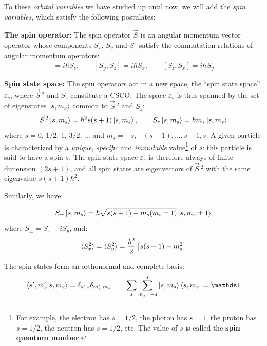 To these \textit{orbital variables} we have studied up until now, we will add the \textit{spin variables}, which satisfy the following postulates:

\begin{postulate}
    \textbf{The spin operator:} The spin operator $\vec{S}$ is an angular momentum vector operator whose components $S_x$, $S_y$ and $S_z$ satisfy the commutation relations of angular momentum operators:
    \begin{equation}
        [S_x, S_y] = i\hbar S_z, \qquad [S_y, S_z] = i\hbar S_x, \qquad [S_z, S_x] = i\hbar S_y
    \end{equation}
\end{postulate}

\begin{postulate}
    \textbf{Spin state space:} The spin operators act in a new space, the ``spin state space'' $\varepsilon_s$, where $\vec{S}\,^2$ and $S_z$ constitute a CSCO. The space $\varepsilon_s$ is thus spanned by the set of eigenstates $\ket{s,m_s}$ common to $\vec{S}\,^2$ and $S_z$:
    \begin{equation}
        \vec{S}\,^2 \ket{s, m_s} = \hbar^2s(s+1)\ket{s, m_s}, \qquad S_z \ket{s, m_s} = \hbar m_s\ket{s, m_s}
    \end{equation}
    where $s = 0,\, 1/2,\, 1,\, 3/2,\, ...$ and $m_s = -s, -(s-1), ..., s-1, s$. A given particle is characterized by a \textit{unique}, \textit{specific} and \textit{immutable} value\footnote{For example, the electron has $s = 1/2$, the photon has $s = 1$, the proton has $s = 1/2$, the neutron has $s = 1/2$, etc. The value of $s$ is called the \textbf{spin quantum number}.} of $s$: this particle is said to have a spin $s$. The spin state space $\varepsilon_s$ is therefore always of finite dimension $(2s + 1)$, and all spin states are eigenvectors of $\vec{S}\,^2$ with the same eigenvalue $s(s + 1)\hbar^2$.
    
    Similarly, we have:

    \begin{equation} \label{eq:spin_pm_ops}
        S_\pm \ket{s, m_s} = \hbar \sqrt{s(s+1)-m_s(m_s\pm 1)}\ket{s, m_s\pm 1}
    \end{equation}
    where $S_\pm = S_x \pm iS_y$, and:
    \begin{equation}
        \braket{S_x^2} = \braket{S_y^2} = \frac{\hbar^2}{2}\left[s(s+1) - m_s^2\right]
    \end{equation}

    The spin states form an orthonormal and complete basis:
    \begin{equation}
        \braket{s', m_s'|s, m_s} = \delta_{s',s}\delta_{m_s',m_s} \qquad \sum_s\sum_{m_s=-s}^{s}\ket{s,m_s}\bra{s,m_s} = \Imat
    \end{equation}
\end{postulate}

